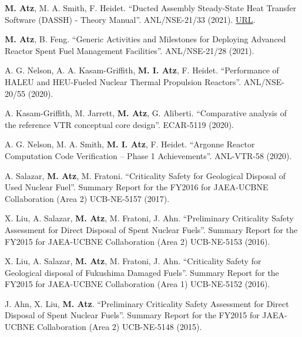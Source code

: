 \documentclass[margin,line]{resume}
\begin{document}
\begin{resume}
\begin{bibenum}
    \item \textbf{M. Atz}, M. A. Smith, F. Heidet. ``Ducted Assembly Steady-State Heat Transfer Software (DASSH) - Theory Manual''. ANL/NSE-21/33 (2021). \href{https://www.osti.gov/biblio/1813446-ducted-assembly-steady-state-heat-transfer-software-dassh-theory-manual}{URL}.
    
    \item \textbf{M. Atz}, B. Feng. ``Generic Activities and Milestones for Deploying Advanced Reactor Spent Fuel Management Facilities''. ANL/NSE-21/28 (2021).
    
    \item A. G. Nelson, A. A. Kasam-Griffith, \textbf{M. I. Atz}, F. Heidet. ``Performance of HALEU and HEU-Fueled Nuclear Thermal Propulsion Reactors''. ANL/NSE-20/55 (2020).
    
    \item A. Kasam-Griffith, M. Jarrett, \textbf{M. Atz}, G. Aliberti. ``Comparative analysis of the reference VTR conceptual core design''. ECAR-5119 (2020).

    \item A. G. Nelson, M. A. Smith, \textbf{M. I. Atz}, F. Heidet. ``Argonne Reactor Computation Code Verification -- Phase 1 Achievements''. ANL-VTR-58 (2020).

    \item A. Salazar, \textbf{M. Atz}, M. Fratoni. ``Criticality Safety for Geological Disposal of Used Nuclear Fuel''. Summary Report for the FY2016 for JAEA-UCBNE Collaboration (Area 2) UCB-NE-5157 (2017).
    
    \item X. Liu, A. Salazar, \textbf{M. Atz}, M. Fratoni, J. Ahn. ``Preliminary Criticality Safety Assessment for Direct Disposal of Spent Nuclear
	Fuels''. Summary Report for the FY2015 for JAEA-UCBNE Collaboration (Area 2) UCB-NE-5153 (2016).
	
	\item X. Liu, A. Salazar, \textbf{M. Atz}, M. Fratoni, J. Ahn. ``Criticality Safety for Geological disposal of Fukushima Damaged Fuels''. Summary Report for the FY2015 for JAEA-UCBNE Collaboration (Area 1) UCB-NE-5152 (2016).

    \item J. Ahn, X. Liu, \textbf{M. Atz}. ``Preliminary Criticality Safety Assessment for Direct Disposal of Spent Nuclear Fuels''. Summary Report for the FY2015 for JAEA-UCBNE Collaboration (Area 2) UCB-NE-5148 (2015).

\end{bibenum}

\end{resume}
\end{document}
